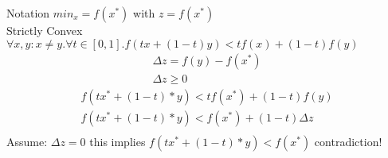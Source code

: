 Notation  $min_x = f(x^*) $ with $z = f(x^*)$ \\
Strictly Convex $\forall x,y: x \neq y. \forall t\in [0,1]. f(tx+(1-t)y) < tf(x) +(1-t)f(y)$ \\
\begin{align*}
\Delta z =  f(y) - f(x^*)\\
\Delta z \ge 0 
\end{align*} 
\begin{align*}
f(tx^*+(1-t)*y) < t f(x^*) + (1-t) f(y) \\
f(tx^*+(1-t)*y) < f(x^*) +(1-t)\Delta z \\
\end{align*}
Assume: $\Delta z = 0$ this implies $f(tx^*+(1-t)*y) < f(x^*)$ contradiction!

 

 